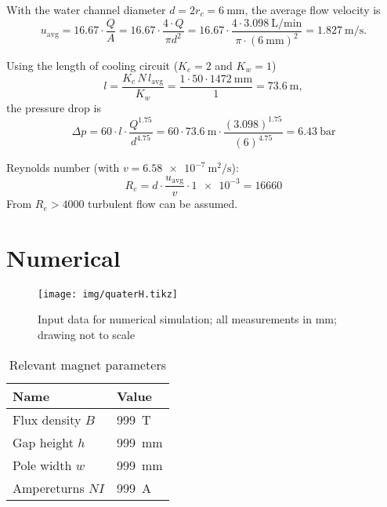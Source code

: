 \documentclass[10pt,a4paper,noendnumber=true]{scrartcl}
\begin{document}
With the water channel diameter $d=2r_c=\SI{6}{\mm}$, the average flow velocity is
\begin{equation}
    u_\text{avg} = 16.67 \cdot \frac{Q}{A} = 16.67 \cdot \frac{4\cdot Q}{\pi d^2} = 16.67 \cdot \frac{4 \cdot \SI{3.098}{\liter\per\minute}}{\pi \cdot (\SI{6}{\mm})^{2}} = \SI{1.827}{\meter\per\second}.
\end{equation}

Using the length of cooling circuit ($K_c=2$ and $K_w=1$)
\begin{equation}
    l = \frac{K_c\,N\,l_\text{avg}}{K_w} = \frac{1\cdot50\cdot\SI{1472}{\mm}}{1} = \SI{73.6}{\meter},
\end{equation}
the pressure drop is
\begin{equation}
    \Delta p 
    = 60 \cdot l \cdot \frac{Q^{1.75}}{d^{4.75}} 
    = 60 \cdot \SI{73.6}{\meter} \cdot \frac{(3.098)^{1.75}}{(6)^{4.75}}
    = \SI{6.43}{\bar}
\end{equation}

Reynolds number (with $v=\SI{6.58e-7}{\meter\squared\per\second}$):
\begin{equation}
    R_e = d \cdot \frac{u_\text{avg}}{v} \cdot \num{1e-3} = \num{16660}
\end{equation}
From $R_e>4000$ turbulent flow can be assumed.





\newpage
\section{Numerical}

\begin{figure}[H]
\centering
\texttt{[image: img/quaterH.tikz]}
\caption{Input data for numerical simulation; all measurements in \si{\mm}; drawing not to scale}
\end{figure}

\begin{table}[H]
\centering
\caption{Relevant magnet parameters}
\begin{tabular}{ll}
\toprule
Name & Value \\
\midrule
Flux density $B$ & \SI{999}{\tesla}\\
Gap height $h$ & \SI{999}{\mm}\\
Pole width $w$ & \SI{999}{\mm}\\
Ampereturns $NI$ & \SI{999}{\ampere}\\
\bottomrule
\end{tabular}
\end{table}
\end{document}
